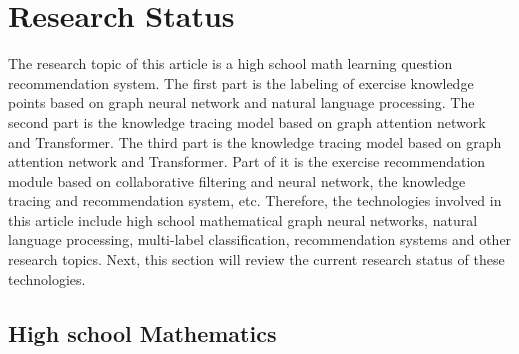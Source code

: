 \section{Research Status}

The research topic of this article is a high school math learning question recommendation system. The first part is the labeling of exercise knowledge points based on graph neural network and natural language processing. The second part is the knowledge tracing model based on graph attention network and Transformer. The third part is the knowledge tracing model based on graph attention network and Transformer. Part of it is the exercise recommendation module based on collaborative filtering and neural network, the knowledge tracing and recommendation system, etc. Therefore, the technologies involved in this article include high school mathematical graph neural networks, natural language processing, multi-label classification, recommendation systems and other research topics. Next, this section will review the current research status of these technologies.

\subsection{High school Mathematics}

